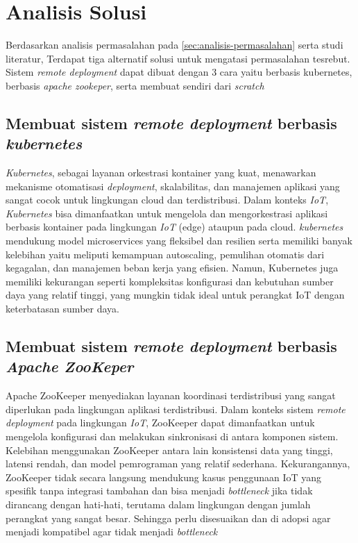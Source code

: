 \section{Analisis Solusi}
\label{sec:analisis-solusi}

Berdasarkan analisis permasalahan pada \ref{sec:analisis-permasalahan} serta studi literatur, Terdapat tiga alternatif solusi untuk mengatasi permasalahan tesrebut. Sistem \textit{remote deployment} dapat dibuat dengan 3 cara yaitu berbasis kubernetes, berbasis \textit{apache zookeper}, serta membuat sendiri dari \textit{scratch}

\subsection{Membuat sistem \textit{remote deployment} berbasis \textit{kubernetes}}
\textit{Kubernetes}, sebagai layanan orkestrasi kontainer yang kuat, menawarkan mekanisme otomatisasi \textit{deployment}, skalabilitas, dan manajemen aplikasi yang sangat cocok untuk lingkungan cloud dan terdistribusi. Dalam konteks \textit{IoT}, \textit{Kubernetes} bisa dimanfaatkan untuk mengelola dan mengorkestrasi aplikasi berbasis kontainer pada lingkungan \textit{IoT} (edge) ataupun pada cloud. \textit{kubernetes} mendukung model microservices yang fleksibel dan resilien serta memiliki banyak kelebihan yaitu  meliputi kemampuan autoscaling, pemulihan otomatis dari kegagalan, dan manajemen beban kerja yang efisien. Namun, Kubernetes juga memiliki kekurangan seperti kompleksitas konfigurasi dan kebutuhan sumber daya yang relatif tinggi, yang mungkin tidak ideal untuk perangkat IoT dengan keterbatasan sumber daya.

\subsection{Membuat sistem \textit{remote deployment} berbasis \textit{Apache ZooKeper}}
Apache ZooKeeper menyediakan layanan koordinasi terdistribusi yang sangat diperlukan pada lingkungan aplikasi terdistribusi. Dalam konteks sistem \textit{remote deployment} pada lingkungan \textit{IoT}, ZooKeeper dapat dimanfaatkan untuk mengelola konfigurasi dan melakukan sinkronisasi di antara komponen sistem. Kelebihan menggunakan ZooKeeper antara lain konsistensi data yang tinggi, latensi rendah, dan model pemrograman yang relatif sederhana. Kekurangannya, ZooKeeper tidak secara langsung mendukung kasus penggunaan IoT yang spesifik tanpa integrasi tambahan dan bisa menjadi \textit{bottleneck} jika tidak dirancang dengan hati-hati, terutama dalam lingkungan dengan jumlah perangkat yang sangat besar. Sehingga perlu disesuaikan dan di adopsi agar menjadi kompatibel agar tidak menjadi \textit{bottleneck}

